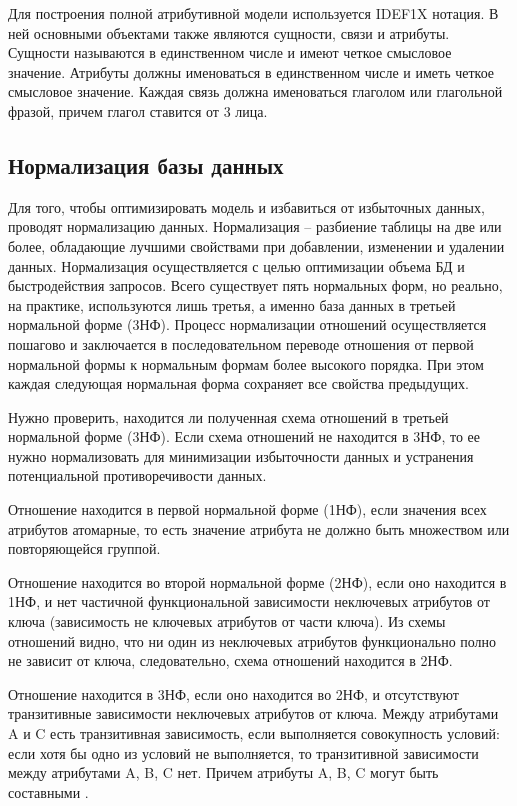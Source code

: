 Для построения полной атрибутивной модели используется IDEF1X нотация. В ней основными объектами также являются сущности, связи и атрибуты. Сущности называются в единственном числе и имеют четкое смысловое значение. Атрибуты должны именоваться в единственном числе и иметь четкое смысловое значение. Каждая связь должна именоваться глаголом или глагольной фразой, причем глагол ставится от 3 лица.

\subsection{Нормализация базы данных}

Для того, чтобы оптимизировать модель и избавиться от избыточных данных, проводят нормализацию данных. Нормализация – разбиение таблицы на две или более, обладающие лучшими свойствами при добавлении, изменении и удалении данных. Нормализация осуществляется с целью оптимизации объема БД и быстродействия запросов. Всего существует пять нормальных форм, но реально, на практике, используются лишь третья, а именно база данных в третьей нормальной форме (3НФ). Процесс нормализации отношений осуществляется пошагово и заключается в последовательном переводе отношения от первой нормальной формы к нормальным формам более высокого порядка. При этом каждая следующая нормальная форма сохраняет все свойства предыдущих.

Нужно проверить, находится ли полученная схема отношений в третьей нормальной форме (3НФ). Если схема отношений не находится в 3НФ, то ее нужно нормализовать для минимизации избыточности данных и устранения потенциальной противоречивости данных.

Отношение находится в первой нормальной форме (1НФ), если значения всех атрибутов атомарные, то есть значение атрибута не должно быть множеством или повторяющейся группой.

Отношение находится во второй нормальной форме (2НФ), если оно находится в 1НФ, и нет частичной функциональной зависимости неключевых атрибутов от ключа (зависимость не ключевых атрибутов от части ключа). Из схемы отношений видно, что ни один из неключевых атрибутов функционально полно не зависит от ключа, следовательно, схема отношений находится в 2НФ.

Отношение находится в 3НФ, если оно находится во 2НФ, и отсутствуют транзитивные зависимости неключевых атрибутов от ключа. Между атрибутами A и C есть транзитивная зависимость, если выполняется совокупность условий: если хотя бы одно из условий не выполняется, то транзитивной зависимости между атрибутами A, B, C нет. Причем атрибуты A, B, C могут быть составными \cite{online12}.

